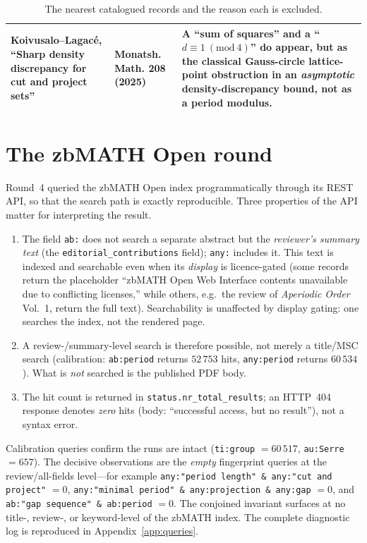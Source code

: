 \documentclass[11pt]{article}
\theoremstyle{plain}
\theoremstyle{remark}
\begin{document}
\begin{table}[h]
\begin{tabular}{@{}>{\raggedright}p{4.6cm}>{\raggedright}p{2.4cm}p{7.3cm}@{}}
Koivusalo--Lagac\'e, ``Sharp density discrepancy for cut and project sets'' \cite{KoivusaloLagace2024}
& Monatsh. Math. 208 (2025)
& A ``sum of squares'' and a ``$d\equiv 1\ (\mathrm{mod}\ 4)$'' do appear, but as the classical Gauss-circle lattice-point obstruction in an \emph{asymptotic} density-discrepancy bound, not as a period modulus.\\
\bottomrule
\end{tabular}
\caption{The nearest catalogued records and the reason each is excluded.}
\label{tab:triage}
\end{table}

\section{The zbMATH Open round}\label{sec:zbmath}

Round~4 queried the zbMATH Open index programmatically through its REST API, so that
the search path is exactly reproducible. Three properties of the API matter for
interpreting the result.

\begin{enumerate}[leftmargin=2.0em,itemsep=3pt]
  \item The field \texttt{ab:} does not search a separate abstract but the
        \emph{reviewer's summary text} (the \texttt{editorial\_contributions}
        field); \texttt{any:} includes it. This text is indexed and searchable even
        when its \emph{display} is licence-gated (some records return the placeholder
        ``zbMATH Open Web Interface contents unavailable due to conflicting
        licenses,'' while others, e.g.\ the review of
        \emph{Aperiodic Order} Vol.~1, return the full text). Searchability is
        unaffected by display gating: one searches the index, not the rendered page.
  \item A review-/summary-level search is therefore possible, not merely a
        title/MSC search (calibration: \texttt{ab:period} returns $52\,753$ hits,
        \texttt{any:period} returns $60\,534$). What is \emph{not} searched is the
        published PDF body.
  \item The hit count is returned in \texttt{status.nr\_total\_results}; an
        HTTP~404 response denotes \emph{zero} hits (body: ``successful access, but no
        result''), not a syntax error.
\end{enumerate}

Calibration queries confirm the runs are intact (\texttt{ti:group} $=60\,517$,
\texttt{au:Serre} $=657$). The decisive observations are the \emph{empty}
fingerprint queries at the review/all-fields level---for example
\texttt{any:"period length" \& any:"cut and project"} $=0$,
\texttt{any:"minimal period" \& any:projection \& any:gap} $=0$, and
\texttt{ab:"gap sequence" \& ab:period} $=0$. The conjoined invariant surfaces at
no title-, review-, or keyword-level of the zbMATH index. The complete diagnostic
log is reproduced in Appendix~\ref{app:queries}.
\end{document}

